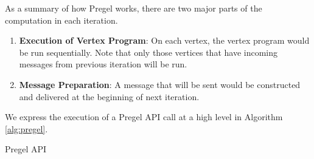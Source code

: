 %
As a summary of how Pregel works, there are two major parts of the computation in each iteration.
%
\begin{enumerate}
%
\item \textbf{Execution of Vertex Program}: 
%
On each vertex, the vertex program would be run sequentially.
%
Note that only those vertices that have incoming messages from previous iteration will be run.
%
\item \textbf{Message Preparation}:
%
A message that will be sent would be constructed and delivered at the beginning of next iteration.
%
\end{enumerate}
%
We express the execution of a Pregel API call at a high level in Algorithm \ref{alg:pregel}.
%
\begin{algorithm}
  \SetAlgoLined
  \caption{Pregel API}
  \label{alg:pregel}
\end{algorithm}
%

